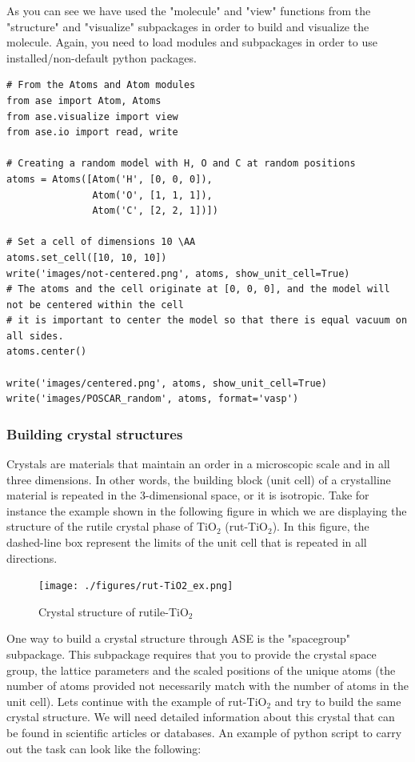 \documentclass[11pt]{article}
\begin{document}
As you can see we have used the "molecule" and "view" functions from the "structure" and "visualize" subpackages in order to build and visualize the molecule. Again, you need to load modules and subpackages in order to use installed/non-default python packages.

\begin{verbatim}
# From the Atoms and Atom modules
from ase import Atom, Atoms
from ase.visualize import view
from ase.io import read, write

# Creating a random model with H, O and C at random positions
atoms = Atoms([Atom('H', [0, 0, 0]),
               Atom('O', [1, 1, 1]), 
               Atom('C', [2, 2, 1])])

# Set a cell of dimensions 10 \AA
atoms.set_cell([10, 10, 10])
write('images/not-centered.png', atoms, show_unit_cell=True)
# The atoms and the cell originate at [0, 0, 0], and the model will not be centered within the cell
# it is important to center the model so that there is equal vacuum on all sides.
atoms.center()

write('images/centered.png', atoms, show_unit_cell=True)
write('images/POSCAR_random', atoms, format='vasp')
\end{verbatim}

\subsubsection{Building crystal structures}
\label{sec-2-3-4}
Crystals are materials that maintain an order in a microscopic scale and in all three dimensions. In other words, the building block (unit cell) of a crystalline material is repeated in the 3-dimensional space, or it is isotropic. Take for instance the example shown in the following figure in which we are displaying the structure of the rutile crystal phase of TiO$_{\text{2}}$ (rut-TiO$_{\text{2}}$). In this figure, the dashed-line box represent the limits of the unit cell that is repeated in all directions.

\begin{figure}[htb]
\centering
\texttt{[image: ./figures/rut-TiO2\_ex.png]}
\caption{Crystal structure of rutile-TiO$_{\text{2}}$}
\end{figure}

One way to build a crystal structure through ASE is the "spacegroup" subpackage. This subpackage requires that you to provide the crystal space group, the lattice parameters and the scaled positions of the unique atoms (the number of atoms provided not necessarily match with the number of atoms in the unit cell). Lets continue with the example of rut-TiO$_{\text{2}}$ and try to build the same crystal structure. We will need detailed information about this crystal that can be found in scientific articles or databases. An example of python script to carry out the task can look like the following:
\end{document}
